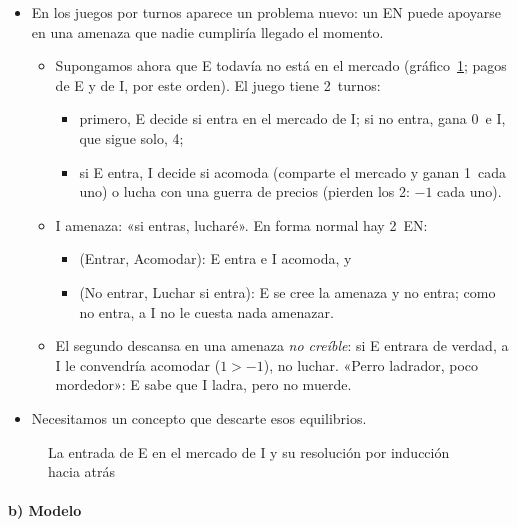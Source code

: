 \documentclass[11pt]{article}
\begin{document}
\begin{itemize}
\item En los juegos por turnos aparece un problema nuevo: un EN puede apoyarse en una amenaza que nadie cumpliría llegado el momento.
  \begin{itemize}
  \item Supongamos ahora que E todavía no está en el mercado (gráfico~\ref{fig:juego-entrada}; pagos de E y de \textup{I}, por este orden). El juego tiene 2~turnos:
    \begin{itemize}
    \item primero, E decide si entra en el mercado de \textup{I}; si no entra, gana 0~e \textup{I}, que sigue solo, 4;
    \item si E entra, \textup{I} decide si acomoda (comparte el mercado y ganan 1~cada uno) o lucha con una guerra de precios (pierden los 2: $-1$ cada uno).
    \end{itemize}
  \item \textup{I} amenaza: «si entras, lucharé». En forma normal hay 2~EN:
    \begin{itemize}
    \item (Entrar, Acomodar): E entra e \textup{I} acomoda, y
    \item (No entrar, Luchar si entra): E se cree la amenaza y no entra; como no entra, a \textup{I} no le cuesta nada amenazar.
    \end{itemize}
  \item El segundo descansa en una amenaza \emph{no creíble}: si E entrara de verdad, a \textup{I} le convendría acomodar ($1>-1$), no luchar. «Perro ladrador, poco mordedor»: E sabe que \textup{I} ladra, pero no muerde.
  \end{itemize}
\item Necesitamos un concepto que descarte esos equilibrios.
\end{itemize}

\begin{figure}[H]
\centering
\caption{La entrada de E en el mercado de \textup{I} y su resolución por inducción hacia atrás}\label{fig:juego-entrada}
\end{figure}

\paragraph{b) Modelo}
\end{document}
